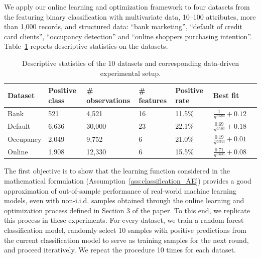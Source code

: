 \documentclass[11pt]{article}
\renewcommand{\arraystretch}{1.5}
\begin{document}
We apply our online learning and optimization framework to four datasets from the \cite{UCI} featuring binary classification with multivariate data, 10--100 attributes, more than 1,000 records, and structured data: ``bank marketing'', ``default of credit card clients'', ``occupancy detection'' and ``online shoppers purchasing intention''. Table~\ref{tab:dataset_AE} reports descriptive statistics on the datasets.

\begin{table}[h!]
\centering \small
\caption{Descriptive statistics of the 10 datasets and corresponding data-driven experimental setup.}
\label{tab:dataset_AE}
\renewcommand{\arraystretch}{1.3}
\begin{tabular}{lllllll}
\toprule[1pt]
Dataset & Positive class & \# observations & \# features & Positive rate & Best fit\\ \midrule[0.5pt]
Bank & 521 & 4,521 & 16 & 11.5\% & $\frac{1}{n^{0.584}}+0.12$ \\
Default & 6,636 & 30,000 & 23 & 22.1\% & $\frac{0.69}{n^{0.703}}+0.18$ \\
Occupancy & 2,049 & 9,752 & 6 & 21.0\% & $\frac{0.19}{n^{0.544}}+0.01$\\
Online & 1,908 & 12,330 & 6 & 15.5\% & $\frac{0.71}{n^{0.635}}+0.08$ \\
\bottomrule[1pt] 
\end{tabular}
\end{table}

The first objective is to show that the learning function considered in the mathematical formulation (Assumption~\ref{ass:classification_AE}) provides a good approximation of out-of-sample performance of real-world machine learning models, even with non-i.i.d. samples obtained through the online learning and optimization process defined in Section 3 of the paper. To this end, we replicate this process in these experiments. For every dataset, we train a random forest classification model, randomly select 10 samples with positive predictions from the current classification model to serve as training samples for the next round, and proceed iteratively. We repeat the procedure 10 times for each dataset. 
\end{document}
